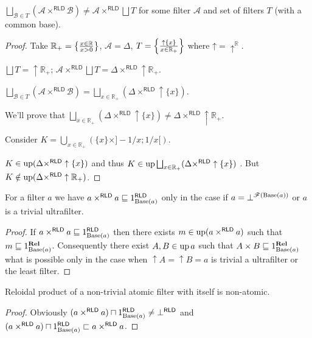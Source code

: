 \begin{example}
$\bigsqcup_{\mathcal{B}\in T}(\mathcal{A}\times^{\mathsf{RLD}}\mathcal{B})\ne\mathcal{A}\times^{\mathsf{RLD}}\bigsqcup T$
for some filter $\mathcal{A}$ and set of filters $T$ (with a common
base).\end{example}
\begin{proof}
Take $\mathbb{R}_{+}=\left\{ \frac{x\in\mathbb{R}}{x>0}\right\}$, $\mathcal{A}=\Delta$,
$T=\left\{ \frac{\uparrow\{x\}}{x\in\mathbb{R}_{+}}\right\}$ where $\mathord\uparrow=\mathord{\uparrow^{\mathbb{R}}}$.

$\bigsqcup T=\uparrow\mathbb{R}_{+}$; $\mathcal{A}\times^{\mathsf{RLD}}\bigsqcup T=\Delta\times^{\mathsf{RLD}}\uparrow\mathbb{R}_{+}$.

$\bigsqcup_{\mathcal{B}\in T}(\mathcal{A}\times^{\mathsf{RLD}}\mathcal{B})=\bigsqcup_{x\in\mathbb{R}_{+}}(\Delta\times^{\mathsf{RLD}}\uparrow\{x\})$.

We'll prove that $\bigsqcup_{x\in\mathbb{R}_{+}}(\Delta\times^{\mathsf{RLD}}\uparrow\{x\})\ne\Delta\times^{\mathsf{RLD}}\uparrow\mathbb{R}_{+}$.

Consider $K=\bigcup_{x\in\mathbb{R}_{+}}(\{x\}\times]-1/x;1/x[)$.

$K\in\operatorname{up}(\Delta\times^{\mathsf{RLD}}\uparrow\{x\})$ and thus $K\in\up\bigsqcup_{x\in\mathbb{R}_{+}}(\Delta\times^{\mathsf{RLD}}\uparrow\{x\})$
. But $K\notin\operatorname{up}(\Delta\times^{\mathsf{RLD}}\uparrow\mathbb{R}_{+})$.\end{proof}
\begin{thm}
For a filter $a$ we have $a\times^{\mathsf{RLD}}a\sqsubseteq1_{\operatorname{Base}(a)}^{\mathsf{RLD}}$
only in the case if $a=\bot^{\mathscr{F}(\operatorname{Base}(a))}$ or $a$ is a
trivial ultrafilter.\end{thm}
\begin{proof}
If $a\times^{\mathsf{RLD}}a\sqsubseteq1_{\operatorname{Base}(a)}^{\mathsf{RLD}}$
then there exists $m\in\operatorname{up}(a\times^{\mathsf{RLD}}a)$ such that $m\sqsubseteq1_{\operatorname{Base}(a)}^{\mathbf{Rel}}$.
Consequently there exist $A,B\in\operatorname{up} a$ such that $A\times B\sqsubseteq1_{\operatorname{Base}(a)}^{\mathbf{Rel}}$
what is possible only in the case when $\uparrow A=\uparrow B=a$
is trivial a ultrafilter or the least filter.\end{proof}
\begin{cor}
Reloidal product of a non-trivial atomic filter with itself is non-atomic.\end{cor}
\begin{proof}
Obviously $(a\times^{\mathsf{RLD}}a)\sqcap1_{\operatorname{Base}(a)}^{\mathsf{RLD}}\ne\bot^{\mathsf{RLD}}$
and $(a\times^{\mathsf{RLD}}a)\sqcap1_{\operatorname{Base}(a)}^{\mathsf{RLD}}\sqsubset a\times^{\mathsf{RLD}}a$.\end{proof}
